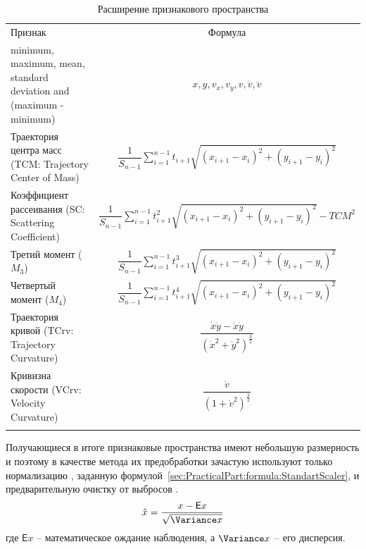 \documentclass[12pt]{article}
\begin{document}
    \begin{table}[h]
        \centering
        \renewcommand{\arraystretch}{1.3}
        \renewcommand{\tabcolsep}{2mm}
        \caption{Расширение признакового пространства}
        \begin{tabular}{ || m{60mm} | c ||}
            \hhline{|t:==:t|} 
            Признак & Формула \\ [2mm]
            \hhline{|:==:|}
            minimum, maximum, mean, standard deviation and (maximum - minimum) & $x, y, v_x, v_y, v, \dot{v}, \ddot{v}$ \\
            \hhline{||-|-||}
            Траектория центра масс (TCM: Trajectory Center of Mass) & $ \dfrac{1}{S_{n-1}} \sum\limits_{i=1}^{n-1} t_{i+1} \sqrt{(x_{i+1} - x_{i})^2 + (y_{i+1} - y_i)^2} $ \\
            \hhline{||-|-||}
            Коэффициент рассеивания (SC: Scattering Coefficient) &  $ \dfrac{1}{S_{n-1}} \sum\limits_{i=1}^{n-1} t_{i+1}^2 \sqrt{(x_{i+1} - x_{i})^2 + (y_{i+1} - y_i)^2} - TCM^2 $ \\
            \hhline{||-|-||}
            Третий момент ($M_3$) & $ \dfrac{1}{S_{n-1}} \sum\limits_{i=1}^{n-1} t_{i+1}^3 \sqrt{(x_{i+1} - x_{i})^2 + (y_{i+1} - y_i)^2} $ \\
            \hhline{||-|-||}
            Четвертый момент ($M_4$) & $ \dfrac{1}{S_{n-1}} \sum\limits_{i=1}^{n-1} t_{i+1}^4 \sqrt{(x_{i+1} - x_{i})^2 + (y_{i+1} - y_i)^2} $ \\
            \hhline{||-|-||}
            Траектория кривой (TCrv: Trajectory Curvature) & $ \dfrac{\dot{x}\ddot{y} - \ddot{x}\dot{y}}{(\dot{x}^2 + \dot{y}^2)^\tfrac{3}{2}} $ \\
            \hhline{||-|-||}
            Кривизна скорости (VCrv: Velocity Curvature) & $ \dfrac{\ddot{v}}{(1 + \dot{v}^2)^\tfrac{3}{2}} $ \\
            \hhline{|b:==:b|}
        \end{tabular}
        \label{sec:Overview:Features:table:ArsFeaturesFormulas}
    \end{table}

    \par Получающиеся в итоге признаковые пространства имеют небольшую размерность и поэтому в качестве метода их предобработки зачастую используют только нормализацию \cite{Fridman, Kasprowski, Tan}, заданную формулой~\ref{sec:PracticalPart:formula:StandartScaler}, и предварительную очистку от выбросов \cite{Tan, Pilankar}.
    \begin{equation}
    \label{sec:PracticalPart:formula:StandartScaler}
        \hat{x}  = \frac{x - \mathsf{E} x}{\sqrt{\Variance x}}
    \end{equation}
    \noindent где $\mathsf{E} x$ -- математическое ождание наблюдения, а $\Variance x$ -- его дисперсия.
    \newpage
\end{document}
